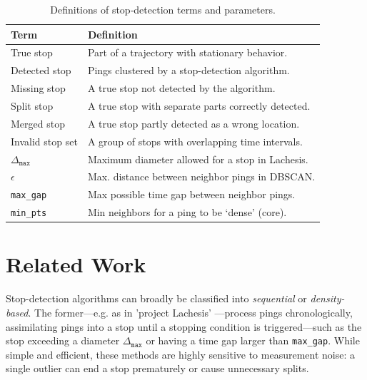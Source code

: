 \documentclass[9pt,twocolumn,twoside]{opticajnl}
\begin{document}
\begin{table}[ht]
\vspace{-1.2em}
\centering
\caption{\small Definitions of stop‐detection terms and parameters.}
\label{tab:stop_definitions}
\small               %
\begin{tabularx}{\columnwidth}{@{} l X @{}}
\toprule
\textbf{Term} & \textbf{Definition} \\ \midrule
True stop                & Part of a trajectory with stationary behavior.\\
Detected stop            & Pings clustered by a stop-detection algorithm.\\
Missing stop             & A true stop not detected by the algorithm.\\
Split stop               & A true stop with separate parts correctly detected.\\
Merged stop              & A true stop partly detected as a wrong location.\\
Invalid stop set         & A group of stops with overlapping time intervals.\\
$\Delta_{\texttt{max}}$ & Maximum diameter allowed for a stop in Lachesis.\\
$\epsilon$              & Max. distance between neighbor pings in DBSCAN.\\
\texttt{max\_gap} & Max possible time gap between neighbor pings.\\
\texttt{min\_pts}        & Min neighbors for a ping to be `dense' (core).\\
\bottomrule
\end{tabularx}
\vspace{-1.25em}
\end{table}

\section{Related Work}

Stop-detection algorithms can broadly be classified into \emph{sequential} or \emph{density-based}. The former---e.g. as in 'project Lachesis' \cite{hariharan2004project}---process pings chronologically, assimilating pings into a stop until a stopping condition is triggered---such as the stop exceeding a diameter $\Delta_{\texttt{max}}$ or having a time gap larger than \texttt{max\_gap}. While simple and efficient, these methods are highly sensitive to measurement noise: a single outlier can end a stop prematurely or cause unnecessary splits.
\end{document}
